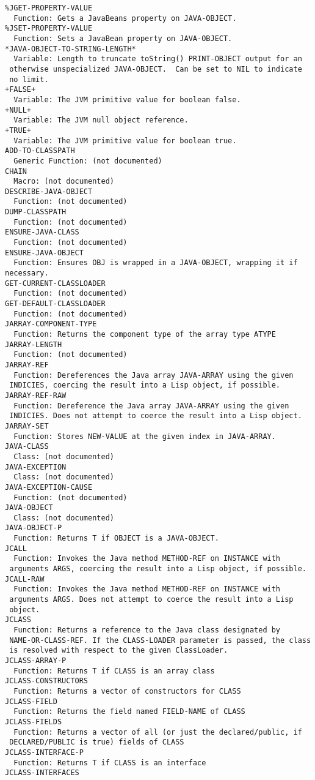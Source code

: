 \begin{verbatim}
%JGET-PROPERTY-VALUE
  Function: Gets a JavaBeans property on JAVA-OBJECT.
%JSET-PROPERTY-VALUE
  Function: Sets a JavaBean property on JAVA-OBJECT.
*JAVA-OBJECT-TO-STRING-LENGTH*
  Variable: Length to truncate toString() PRINT-OBJECT output for an
 otherwise unspecialized JAVA-OBJECT.  Can be set to NIL to indicate
 no limit.
+FALSE+
  Variable: The JVM primitive value for boolean false.
+NULL+
  Variable: The JVM null object reference.
+TRUE+
  Variable: The JVM primitive value for boolean true.
ADD-TO-CLASSPATH
  Generic Function: (not documented)
CHAIN
  Macro: (not documented)
DESCRIBE-JAVA-OBJECT
  Function: (not documented)
DUMP-CLASSPATH
  Function: (not documented)
ENSURE-JAVA-CLASS
  Function: (not documented)
ENSURE-JAVA-OBJECT
  Function: Ensures OBJ is wrapped in a JAVA-OBJECT, wrapping it if necessary.
GET-CURRENT-CLASSLOADER
  Function: (not documented)
GET-DEFAULT-CLASSLOADER
  Function: (not documented)
JARRAY-COMPONENT-TYPE
  Function: Returns the component type of the array type ATYPE
JARRAY-LENGTH
  Function: (not documented)
JARRAY-REF
  Function: Dereferences the Java array JAVA-ARRAY using the given
 INDICIES, coercing the result into a Lisp object, if possible.
JARRAY-REF-RAW
  Function: Dereference the Java array JAVA-ARRAY using the given
 INDICIES. Does not attempt to coerce the result into a Lisp object.
JARRAY-SET
  Function: Stores NEW-VALUE at the given index in JAVA-ARRAY.
JAVA-CLASS
  Class: (not documented)
JAVA-EXCEPTION
  Class: (not documented)
JAVA-EXCEPTION-CAUSE
  Function: (not documented)
JAVA-OBJECT
  Class: (not documented)
JAVA-OBJECT-P
  Function: Returns T if OBJECT is a JAVA-OBJECT.
JCALL
  Function: Invokes the Java method METHOD-REF on INSTANCE with
 arguments ARGS, coercing the result into a Lisp object, if possible.
JCALL-RAW
  Function: Invokes the Java method METHOD-REF on INSTANCE with
 arguments ARGS. Does not attempt to coerce the result into a Lisp
 object.
JCLASS
  Function: Returns a reference to the Java class designated by
 NAME-OR-CLASS-REF. If the CLASS-LOADER parameter is passed, the class
 is resolved with respect to the given ClassLoader.
JCLASS-ARRAY-P
  Function: Returns T if CLASS is an array class
JCLASS-CONSTRUCTORS
  Function: Returns a vector of constructors for CLASS
JCLASS-FIELD
  Function: Returns the field named FIELD-NAME of CLASS
JCLASS-FIELDS
  Function: Returns a vector of all (or just the declared/public, if
 DECLARED/PUBLIC is true) fields of CLASS
JCLASS-INTERFACE-P
  Function: Returns T if CLASS is an interface
JCLASS-INTERFACES

\end{verbatim}
